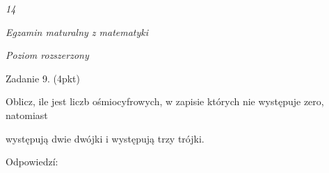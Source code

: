 \documentclass[a4paper,12pt]{article}
\begin{document}
{\it 14}

{\it Egzamin maturalny z matematyki}

{\it Poziom rozszerzony}

Zadanie 9. (4pkt)

Oblicz, ile jest liczb ośmiocyfrowych, w zapisie których nie występuje zero, natomiast

występują dwie dwójki i występują trzy trójki.

Odpowiedzí:
\end{document}

